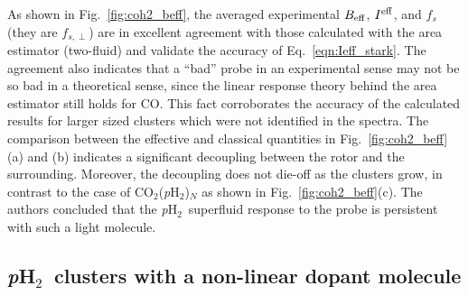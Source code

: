 \documentclass[12pt]{iopart}
\newcommand{\phtwo}{{\em p}H$_2$}
\begin{document}
As shown in Fig.~\ref{fig:coh2_beff}, the averaged experimental $B_{\rm eff}$, $I^{\rm eff}$, and $f_s$ (they are $f_{s,\perp}$) are in excellent agreement with those calculated with the area estimator (two-fluid) and validate the accuracy of Eq.~\ref{eqn:Ieff_stark}. 
The agreement also indicates that a ``bad'' probe in an experimental sense may not be so bad in a theoretical sense, 
since the linear response theory behind the area estimator still holds for CO. 
This fact corroborates the accuracy of the calculated results for larger sized clusters which were not identified in the spectra. 
The comparison between the effective and classical quantities in Fig.~\ref{fig:coh2_beff}(a) and (b) indicates a significant decoupling between the rotor and the surrounding. 
Moreover, the decoupling does not die-off as the clusters grow, in contrast to the case of CO$_2$(\phtwo)$_N$ as shown in Fig.~\ref{fig:coh2_beff}(c). The authors concluded that the \phtwo~superfluid response to the probe is persistent with such a light molecule.

\subsection{\phtwo~clusters with a non-linear dopant molecule} \label{subsec:nonlinear}
\end{document}
